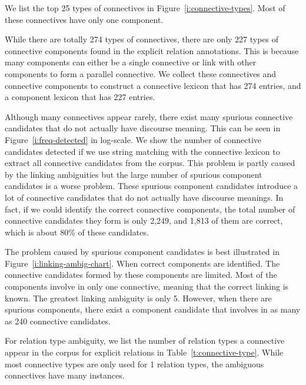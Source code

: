 




We list the top 25 types of connectives in Figure~\ref{i:connective-types}.
Most of these connectives have only one component.



While there are totally 274 types of connectives, there are only 227 types
of connective components found in the explicit relation annotations. This
is because many components can either be a single connective or link
with other components to form a parallel connective. We collect these
connectives and connective components to construct a connective lexicon
that has 274 entries, and a component lexicon that has 227 entries.


Although many connectives appear rarely, there exist many spurious connective
candidates that do not actually have discourse meaning. This can be seen in
Figure~\ref{i:freq-detected} in log-scale. We show the number of connective candidates
detected if we use string matching with the connective lexicon to extract
all connective candidates from the corpus. This problem is partly caused by the linking
ambiguities but the large number of spurious component candidates is a worse problem.
These spurious component candidates introduce a lot of connective candidates that
do not actually have discourse meanings. In fact, if we could identify the correct
connective components, the total number of connective candidates they form
is only 2,249, and 1,813 of them are correct, which is about 80\% of these candidates.



The problem caused by spurious component candidates is best illustrated in
Figure~\ref{i:linking-ambig-chart}. When correct components are identified.
The connective candidates formed by these components are limited.
Most of the components involve in only one connective, meaning that the correct linking
is known. The greatest linking ambiguity is only 5. However, when there are
spurious components, there exist a component candidate that involves in as many
as 240 connective candidates.



For relation type ambiguity, we list the number of relation types a
connective appear in the corpus for explicit relations in Table~\ref{t:connective-type}.
While most connective types are only used for 1 relation types,
the ambiguous connectives have many instances.

